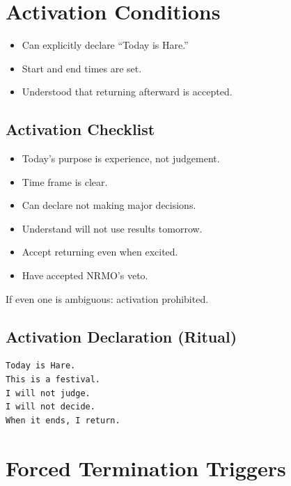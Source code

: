 
\section{Activation Conditions}
\label{sec:hare-activation}

\begin{itemize}
\item Can explicitly declare ``Today is Hare.''
\item Start and end times are set.
\item Understood that returning afterward is accepted.
\end{itemize}

\subsection{Activation Checklist}

\begin{itemize}
\item[$\square$] Today's purpose is experience, not judgement.
\item[$\square$] Time frame is clear.
\item[$\square$] Can declare not making major decisions.
\item[$\square$] Understand will not use results tomorrow.
\item[$\square$] Accept returning even when excited.
\item[$\square$] Have accepted NRMO's veto.
\end{itemize}

\noindent
If even one is ambiguous: activation prohibited.

\subsection{Activation Declaration (Ritual)}

\begin{lstlisting}[basicstyle=\ttfamily\small,frame=single]
Today is Hare.
This is a festival.
I will not judge.
I will not decide.
When it ends, I return.
\end{lstlisting}

\section{Forced Termination Triggers}
\label{sec:hare-termination}

